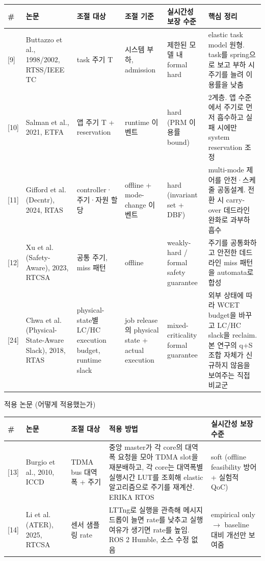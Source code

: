 \documentclass[10pt]{article}
\begin{document}
\begin{center}\scriptsize
\begin{tabular}{@{}C{0.6cm}L{2.5cm}L{2.4cm}L{2.2cm}L{2.4cm}L{4.4cm}@{}}
\toprule
\# & 논문 & 조절 대상 & 조절 기준 & 실시간성 보장 수준 & 핵심 정리 \\ \midrule
{[9]} & Buttazzo et al., 1998/2002, RTSS/IEEE TC & task 주기 T & 시스템 부하, admission & 제한된 모델 내 formal hard & elastic task model 원형. task를 spring으로 보고 부하 시 주기를 늘려 이용률을 낮춤 \\
{[10]} & Salman et al., 2021, ETFA & 앱 주기 T + reservation & runtime 이벤트 & hard (PRM 이용률 bound) & 2계층. 앱 수준에서 주기로 먼저 흡수하고 실패 시에만 system reservation 조정 \\
{[11]} & Gifford et al. (Decntr), 2024, RTAS & controller·주기·자원 할당 & offline + mode-change 이벤트 & hard (invariant set + DBF) & multi-mode 제어를 안전·스케줄 공동설계. 전환 시 carry-over 데드라인 완화로 과부하 흡수 \\
{[12]} & Xu et al. (Safety-Aware), 2023, RTCSA & 공통 주기, miss 패턴 & offline & weakly-hard / formal safety guarantee & 주기를 공통화하고 안전한 데드라인 miss 패턴을 automata로 합성 \\
{[24]} & Chwa et al. (Physical-State-Aware Slack), 2018, RTAS & physical-state별 LC/HC execution budget, runtime slack & job release의 physical state + actual execution & mixed-criticality formal guarantee & 외부 상태에 따라 WCET budget을 바꾸고 LC/HC slack을 reclaim. 본 연구의 q+S 조합 자체가 신규하지 않음을 보여주는 직접 비교군 \\
\bottomrule
\end{tabular}
\end{center}
\noindent 적용 논문 (어떻게 적용했는가)
\begin{center}\scriptsize
\begin{tabular}{@{}C{0.6cm}L{2.2cm}L{2.4cm}L{6.5cm}L{2.4cm}@{}}
\toprule
\# & 논문 & 조절 대상 & 적용 방법 & 실시간성 보장 수준 \\ \midrule
{[13]} & Burgio et al., 2010, ICCD & TDMA bus 대역폭 + 주기 & 중앙 master가 각 core의 대역폭 요청을 모아 TDMA slot을 재분배하고, 각 core는 대역폭별 실행시간 LUT를 조회해 elastic 알고리즘으로 주기를 재계산. ERIKA RTOS & soft (offline feasibility 방어 + 실험적 QoC) \\
{[14]} & Li et al. (ATER), 2025, RTCSA & 센서 샘플링 rate & LTTng로 실행을 관측해 메시지 드롭이 늘면 rate를 낮추고 실행 여유가 생기면 rate를 높임. ROS 2 Humble, 소스 수정 없음 & empirical only $\rightarrow$ baseline 대비 개선만 보여줌 \\
\bottomrule
\end{tabular}
\end{center}
\end{document}
